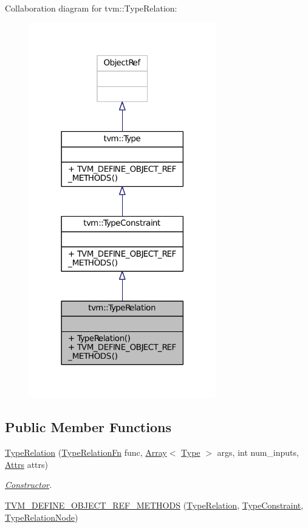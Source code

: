 Collaboration diagram for tvm\+:\+:Type\+Relation\+:
\nopagebreak
\begin{figure}[H]
\begin{center}
\leavevmode
\includegraphics[width=230pt]{classtvm_1_1TypeRelation__coll__graph}
\end{center}
\end{figure}
\subsection*{Public Member Functions}
\begin{DoxyCompactItemize}
\item 
\hyperlink{classtvm_1_1TypeRelation_ac26b1897eab8197ed26606ab81b7403b}{Type\+Relation} (\hyperlink{namespacetvm_a72dcba4493adfcd8908663898ece3514}{Type\+Relation\+Fn} func, \hyperlink{classtvm_1_1Array}{Array}$<$ \hyperlink{classtvm_1_1Type}{Type} $>$ args, int num\+\_\+inputs, \hyperlink{classtvm_1_1Attrs}{Attrs} attrs)
\begin{DoxyCompactList}\small\item\em \hyperlink{classtvm_1_1Constructor}{Constructor}. \end{DoxyCompactList}\item 
\hyperlink{classtvm_1_1TypeRelation_ad93ef54a0be61d0aa5eeb5752efb8772}{T\+V\+M\+\_\+\+D\+E\+F\+I\+N\+E\+\_\+\+O\+B\+J\+E\+C\+T\+\_\+\+R\+E\+F\+\_\+\+M\+E\+T\+H\+O\+DS} (\hyperlink{classtvm_1_1TypeRelation}{Type\+Relation}, \hyperlink{classtvm_1_1TypeConstraint}{Type\+Constraint}, \hyperlink{classtvm_1_1TypeRelationNode}{Type\+Relation\+Node})
\end{DoxyCompactItemize}


